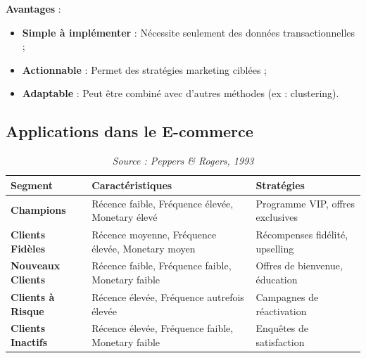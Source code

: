 \documentclass[a4paper,12pt]{article}
\begin{document}
\textbf{Avantages} :
\begin{itemize}
    \item \textbf{Simple à implémenter} : Nécessite seulement des données transactionnelles ;
    \item \textbf{Actionnable} : Permet des stratégies marketing ciblées ;
    \item \textbf{Adaptable} : Peut être combiné avec d'autres méthodes (ex : clustering).
\end{itemize}

\subsection{Applications dans le E-commerce}
\begin{table}[H]
\centering
\begin{tabular}{|l|p{4.5cm}|p{4.5cm}|}
\hline
\textbf{Segment} & \textbf{Caractéristiques} & \textbf{Stratégies} \\
\hline
\textbf{Champions} & Récence faible, Fréquence élevée, Monetary élevé & Programme VIP, offres exclusives \\
\hline
\textbf{Clients Fidèles} & Récence moyenne, Fréquence élevée, Monetary moyen & Récompenses fidélité, upselling \\
\hline
\textbf{Nouveaux Clients} & Récence faible, Fréquence faible, Monetary faible & Offres de bienvenue, éducation \\
\hline
\textbf{Clients à Risque} & Récence élevée, Fréquence autrefois élevée & Campagnes de réactivation \\
\hline
\textbf{Clients Inactifs} & Récence élevée, Fréquence faible, Monetary faible & Enquêtes de satisfaction \\
\hline
\end{tabular}
\caption{Stratégies marketing par segment RFM}
\caption*{\textit{Source : Peppers & Rogers, 1993}}
\label{tab:rfm_strategies}
\end{table}
\end{document}
